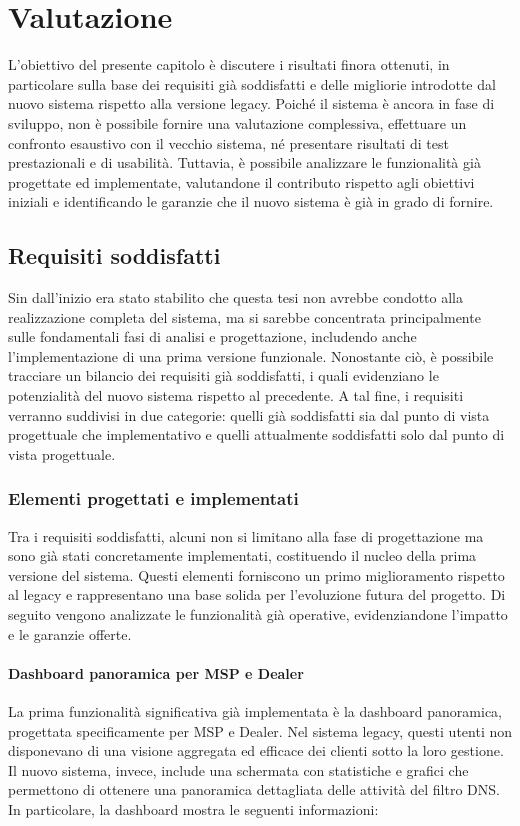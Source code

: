 \chapter{Valutazione}

L'obiettivo del presente capitolo è discutere i risultati finora ottenuti, in particolare sulla base dei requisiti già soddisfatti e delle migliorie introdotte dal nuovo sistema rispetto alla versione legacy. Poiché il sistema è ancora in fase di sviluppo, non è possibile fornire una valutazione complessiva, effettuare un confronto esaustivo con il vecchio sistema, né presentare risultati di test prestazionali e di usabilità. Tuttavia, è possibile analizzare le funzionalità già progettate ed implementate, valutandone il contributo rispetto agli obiettivi iniziali e identificando le garanzie che il nuovo sistema è già in grado di fornire.

\section{Requisiti soddisfatti}
Sin dall'inizio era stato stabilito che questa tesi non avrebbe condotto alla realizzazione completa del sistema, ma si sarebbe concentrata principalmente sulle fondamentali fasi di analisi e progettazione, includendo anche l'implementazione di una prima versione funzionale. Nonostante ciò, è possibile tracciare un bilancio dei requisiti già soddisfatti, i quali evidenziano le potenzialità del nuovo sistema rispetto al precedente. A tal fine, i requisiti verranno suddivisi in due categorie: quelli già soddisfatti sia dal punto di vista progettuale che implementativo e quelli attualmente soddisfatti solo dal punto di vista progettuale.

\subsection{Elementi progettati e implementati}
Tra i requisiti soddisfatti, alcuni non si limitano alla fase di progettazione ma sono già stati concretamente implementati, costituendo il nucleo della prima versione del sistema. Questi elementi forniscono un primo miglioramento rispetto al legacy e rappresentano una base solida per l’evoluzione futura del progetto. Di seguito vengono analizzate le funzionalità già operative, evidenziandone l'impatto e le garanzie offerte.

\subsubsection{Dashboard panoramica per MSP e Dealer}
La prima funzionalità significativa già implementata è la dashboard panoramica, progettata specificamente per MSP e Dealer. Nel sistema legacy, questi utenti non disponevano di una visione aggregata ed efficace dei clienti sotto la loro gestione. Il nuovo sistema, invece, include una schermata con statistiche e grafici che permettono di ottenere una panoramica dettagliata delle attività del filtro DNS. In particolare, la dashboard mostra le seguenti informazioni:


